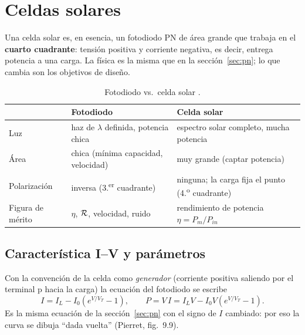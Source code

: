 \section{Celdas solares}
\label{sec:solar}

Una celda solar es, en esencia, un fotodiodo PN de área grande que trabaja en el
\textbf{cuarto cuadrante}: tensión positiva y corriente negativa, es decir, entrega
potencia a una carga. La física es la misma que en la sección~\ref{sec:pn}; lo que cambia
son los objetivos de diseño.

\begin{table}[H]
\centering\small
\caption{Fotodiodo vs.\ celda solar .}
\label{tab:fd-vs-celda}
\begin{tabular}{p{}p{}p{}}
\toprule
 & \textbf{Fotodiodo} & \textbf{Celda solar} \\
\midrule
Luz            & haz de $\lambda$ definida, potencia chica & espectro solar completo, mucha potencia \\
Área           & chica (mínima capacidad, velocidad) & muy grande (captar potencia) \\
Polarización   & inversa (3.\textsuperscript{er} cuadrante) & ninguna; la carga fija el punto (4.\textsuperscript{o} cuadrante) \\
Figura de mérito & $\eta$, $\mathcal{R}$, velocidad, ruido & rendimiento de potencia $\eta=P_m/P_{in}$ \\
\bottomrule
\end{tabular}
\end{table}

\subsection{Característica I--V y parámetros}

Con la convención de la celda como \emph{generador} (corriente positiva saliendo por el
terminal p hacia la carga) la ecuación del fotodiodo se escribe
\[
  I = I_L - I_0\left(e^{V/V_T}-1\right),
  \qquad
  P = V\,I = I_L V - I_0 V\left(e^{V/V_T}-1\right).
\]
Es la misma ecuación de la sección~\ref{sec:pn} con el signo de $I$ cambiado: por eso la
curva se dibuja ``dada vuelta'' (Pierret, fig.~9.9).

